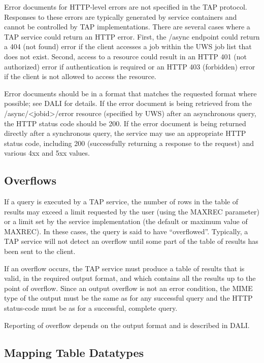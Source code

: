 \documentclass[11pt,letter]{ivoa}
\begin{document}
Error documents for HTTP-level errors are not specified in the TAP protocol. 
Responses to these errors are typically generated by service containers and 
cannot be controlled by TAP implementations. There are several cases where a 
TAP 
service could return an HTTP error. First, the /async endpoint could return a 
404 (not found) error if the client accesses a job within the UWS job list that 
does not exist. Second, access to a resource could result in an HTTP 401 (not 
authorized) error if authentication is required or an HTTP 403 (forbidden) 
error if the client is not allowed to access the resource.

Error documents should be in a format that matches the requested
format where possible; see DALI for details. 
If the error document is being retrieved 
from the /async/<jobid>/error resource (specified by UWS) after an asynchronous 
query, the HTTP status code should be 200. If the error document is being 
returned directly after a synchronous query, the service may use an appropriate 
HTTP status code, including 200 (successfully returning a response to the 
request) and various 4xx and 5xx values.

\subsection{Overflows}
\label{sec:query-overflow}

If a query is executed by a TAP service, the number of rows in the table of 
results may exceed a limit requested by the user (using the MAXREC parameter) 
or a limit set by the service implementation (the default or maximum value of 
MAXREC). In these cases, the query is said to have ``overflowed''. Typically, a 
TAP service will not detect an overflow until some part of the table of results 
has been sent to the client.

If an overflow occurs, the TAP service must produce a table of results that is 
valid, in the required output format, and which contains all the results up to 
the point of overflow. Since an output overflow is not an error condition, the 
MIME type of the output must be the same as for any successful query and the 
HTTP status-code must be as for a successful, complete query.

Reporting of overflow depends on the output format and is described in DALI.

\subsection{Mapping Table Datatypes}
\label{sec:vot-rdbms}
\end{document}
